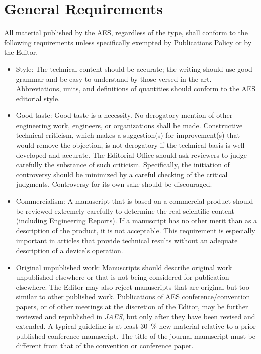 \documentclass[fleqn]{jaes}
\begin{document}
\section{General Requirements}\label{sec:general}
All material published by the AES, regardless of the type, shall conform to the following requirements unless specifically exempted by Publications Policy or by the Editor.

\begin{itemize}
    \item Style: The technical content should be accurate; the writing should use good grammar and be easy to understand by those versed in the art. Abbreviations, units, and definitions of quantities should conform to the AES editorial style.
    
    \item Good taste: Good taste is a necessity. No derogatory mention of other engineering work, engineers, or organizations shall be made. Constructive technical criticism, which makes a suggestion(s) for improvement(s) that would remove the objection, is not derogatory if the technical basis is well developed and accurate. The Editorial Office should ask reviewers to judge carefully the substance of such criticism. Specifically, the initiation of controversy should be minimized by a careful checking of the critical judgments. Controversy for its own sake should be discouraged.
    
    \item Commercialism: A manuscript that is based on a commercial product should be reviewed extremely carefully to determine the real scientific content (including Engineering Reports). If a manuscript has no other merit than as a description of the product, it is not acceptable. This requirement is especially important in articles that provide technical results without an adequate description of a device’s operation.
    
    \item Original unpublished work: Manuscripts should describe original work unpublished elsewhere or that is not being considered for publication elsewhere. The Editor may also reject manuscripts that are original but too similar to other published work. Publications of AES conference/convention papers, or of other meetings at the discretion of the Editor, may be further reviewed and republished in \emph{JAES}, but only after they have been revised and extended. A typical guideline is at least \SI{30}{\percent} new material relative to a prior published conference manuscript. The title of the journal manuscript must be different from that of the convention or conference paper. 
    

\end{itemize}
\end{document}
